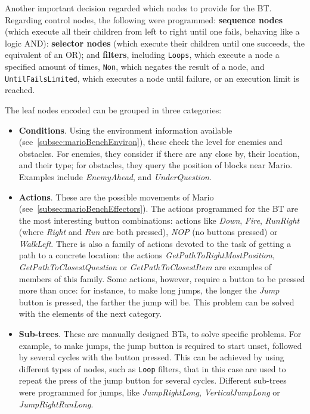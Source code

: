 \documentclass[conference]{IEEEtran}
\begin{document}
Another important decision regarded which nodes to provide for the BT.
Regarding control nodes, the following were programmed: 
\textbf{sequence nodes} (which execute all their children from
left to right until one fails, behaving like a logic AND):
\textbf{selector nodes} (which execute their children
until one succeeds, the equivalent of an OR); and 
\textbf{filters}, including \texttt{Loops}, which execute a node
a specified amount of times, \texttt{Non}, which negates the result of a
node, and \texttt{UntilFailsLimited}, which
executes a node until failure, or an execution limit is reached.

The leaf nodes encoded can be grouped in three categories:

\begin{itemize}
\item \textbf{Conditions}. Using the environment information available 
(see~\ref{subsec:marioBenchEnviron}), these check the level for enemies and
obstacles. For enemies, they consider if there are any close by, their
location, and their type; for obstacles, they query the position of
blocks near Mario. Examples include \textit{EnemyAhead}, and 
\textit{UnderQuestion}.

\item \textbf{Actions}. These are the possible movements of Mario 
(see~\ref{subsec:marioBenchEffectors}). The actions programmed for the BT are the
most interesting button combinations: actions like
\textit{Down}, \textit{Fire}, \textit{RunRight} (where \textit{Right} and
\textit{Run} are both pressed), \textit{NOP} (no buttons pressed) or
\textit{WalkLeft}. There is also a family of actions devoted to the task of
getting a path to a concrete location: the actions 
\textit{GetPathToRightMostPosition}, \textit{GetPathToClosestQuestion} or
\textit{GetPathToClosestItem} are examples of members of this family. 
Some actions, however, require a button to be pressed more
than once: for instance, to make long jumps, the longer the \textit{Jump}
button is pressed, the farther the jump will be. This problem can be solved
with the elements of the next category.

\item \textbf{Sub-trees}. These are manually designed BTs, to solve specific
problems. For example, to make jumps, the jump button is required to start
unset, followed by several cycles with the button pressed. This can be
achieved by using different types of nodes, such as \texttt{Loop} filters,
that in this case are used to repeat the press of the jump button for several cycles.
Different sub-trees were programmed for jumps, like 
\textit{JumpRightLong}, \textit{VerticalJumpLong} or \textit{JumpRightRunLong}.


\end{itemize}
\end{document}

